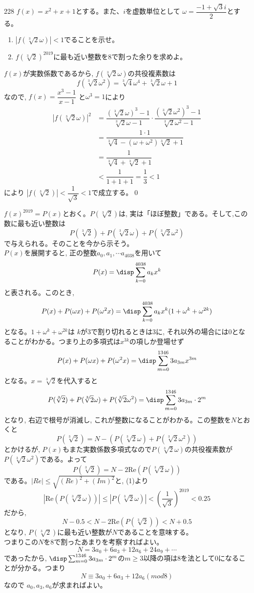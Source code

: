 \begin{prob}{228}{}{}
 $f(x)=x^2+x+1$とする。また、$i$を虚数単位として $\omega=\dfrac{-1+\sqrt{3}i}{2}$とする。
 \begin{enumerate}
  \item $\left|f\left(\sqrt[3]{2}\omega\right)\right|<1$でることを示せ。
  \item $f\left(\sqrt[3]{2}\right)^{2019}$に最も近い整数を8で割った余りを求めよ。
 \end{enumerate}
\end{prob}
$f(x)$が実数係数であるから, $f(\sqrt[3]{2}\omega )$の共役複素数は
\[f(\sqrt[3]{2}\omega^2)=\sqrt[3]{4}\omega^4 +\sqrt[3]{2}\omega +1\]
なので, $f(x)=\dfrac{x^3-1}{x-1}$ と$\omega^3=1$により
\begin{align*}
\left|f\left(\sqrt[3]{2}\omega\right)\right|^2&=\dfrac{(\sqrt[3]{2}\omega)^3-1}{\sqrt[3]{2}\omega-1}\cdot \dfrac{(\sqrt[3]{2}\omega^2)^3-1}{\sqrt[3]{2}\omega^2-1}\\
&=\dfrac{1\cdot 1}{\sqrt[3]{4}-(\omega +\omega^2)\sqrt[3]{2} +1}\\
&= \dfrac{1}{\sqrt[3]{4}+\sqrt[3]{2}+1}\\
&< \dfrac{1}{1+1+1}=\dfrac{1}{3} <1
\end{align*}
により $|f(\sqrt[3]{2})|<\dfrac{1}{\sqrt{3}}<1$で成立する。\qed

$f(x)^{2019}=P(x)$とおく。$P(\sqrt[3]{2})$は, 実は「ほぼ整数」である。そして,この数に最も近い整数は
\[P(\sqrt[3]{2})+P(\sqrt[3]{2}\omega)+P(\sqrt[3]{2}\omega^2)\]
で与えられる。そのことを今から示そう。\\
$P(x)$を展開すると, 正の整数$a_0,a_1,\cdots a_{4038}$を用いて
\[P(x)=\disp\sum_{k=0}^{4038}a_kx^k\]
と表される。このとき,
\[P(x)+P(\omega x)+P(\omega^2 x)=\disp\sum_{k=0}^{4038}a_kx^k(1+\omega^k+\omega^{2k})\]
となる。$1+\omega^k +\omega^{2k}$は $k$が$3$で割り切れるときは$3$に, それ以外の場合には$0$となることがわかる。つまり上の多項式は$x^{3k}$の項しか登場せず
\[P(x)+P(\omega x)+P(\omega^2 x)=\disp\sum_{m=0}^{1346}3a_{3m}x^{3m}\]
となる。$x=\sqrt[3]{2}$を代入すると
\[P(\sqrt[3]{2})+P(\sqrt[3]{2}\omega )+P(\sqrt[3]{2}\omega^2)=\disp\sum_{m=0}^{1346}3a_{3m}\cdot 2^m\]
となり, 右辺で根号が消滅し, これが整数になることがわかる。この整数を$N$とおくと
\[P(\sqrt[3]{2})=N-(P(\sqrt[3]{2}\omega)+P(\sqrt[3]{2}\omega^2))\]
とかけるが, $P(x)$もまた実数係数多項式なので$P(\sqrt[3]{2}\omega )$の共役複素数が$P(\sqrt[3]{2}\omega^2)$である。よって
\[P(\sqrt[3]{2})=N-2\mbox{Re}(P(\sqrt[3]{2}\omega))\]
である。$|Re|\leq \sqrt{(Re)^2+(Im)^2}$と, (1)より
\[|\mbox{Re}(P(\sqrt[3]{2}\omega))|\leq |P(\sqrt[3]{2}\omega)|<\left(\dfrac{1}{\sqrt{3}}\right)^{2019}<0.25\]
だから, 
\[N-0.5<N-2\mbox{Re}(P(\sqrt[3]{2}))<N+0.5\]
となり, $P(\sqrt[3]{2})$に最も近い整数が$N$であることを意味する。\\
つまりこの$N$を8で割ったあまりを考察すればよい。
\[N=3a_0+6a_3+12a_6+24a_9+\cdots\]
であったから, $\disp\sum_{m=0}^{1346}3a_{3m}\cdot 2^m$の$m\geq 3$以降の項は8を法として0になることが分かる。つまり
\[N\equiv 3a_0+6a_3+12a_6　(mod 8)\]
なので $a_0,a_3,a_6$が求まればよい。

